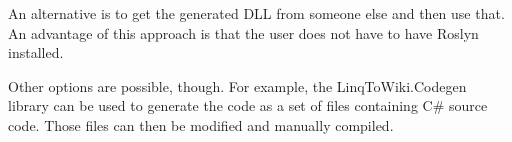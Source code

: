 An alternative is to get the generated \ac{DLL} from someone else and then use that.
An advantage of this approach is that the user does not have to have Roslyn installed.

Other options are possible, though.
For example, the LinqToWiki.Codegen library can be used to generate the code as a set of files containing C\# source code.
Those files can then be modified and manually compiled.







